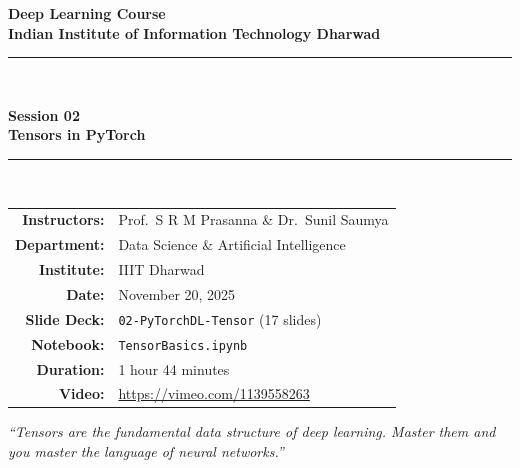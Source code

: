 \documentclass[12pt,a4paper]{article}
\newcommand{\tbf}[1]{\textbf{#1}}
\begin{document}

\begin{titlepage}
  \centering
  \vspace*{2cm}
  {\LARGE\bfseries Deep Learning Course\\[0.4em]
   \large Indian Institute of Information Technology Dharwad\par}
  \vspace{1.5cm}
  \rule{\linewidth}{0.5pt}\\[0.6em]
  {\Huge\bfseries Session 02\\[0.3em]
   \LARGE Tensors in PyTorch\par}
  \rule{\linewidth}{0.5pt}\\[1.2cm]

  \begin{tabular}{rl}
    \tbf{Instructors:}  & Prof.\ S R M Prasanna \& Dr.\ Sunil Saumya \\[4pt]
    \tbf{Department:}   & Data Science \& Artificial Intelligence \\[4pt]
    \tbf{Institute:}    & IIIT Dharwad \\[4pt]
    \tbf{Date:}         & November 20, 2025 \\[4pt]
    \tbf{Slide Deck:}   & \texttt{02-PyTorchDL-Tensor} (17 slides) \\[4pt]
    \tbf{Notebook:}     & \texttt{TensorBasics.ipynb} \\[4pt]
    \tbf{Duration:}     & 1 hour 44 minutes \\[4pt]
    \tbf{Video:}        & \url{https://vimeo.com/1139558263} \\
  \end{tabular}

  \vfill
  {\large\itshape ``Tensors are the fundamental data structure of deep learning.
   Master them and you master the language of neural networks.''\par}
  \vspace{1cm}
\end{titlepage}

\tableofcontents
\newpage

\end{document}
